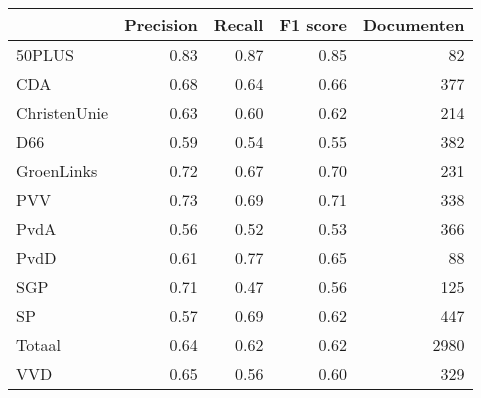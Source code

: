 \begin{tabular}{lrrrr}
\toprule
{} &  Precision &  Recall &  F1 score &  Documenten \\
\midrule
50PLUS       &       0.83 &    0.87 &      0.85 &          82 \\
CDA          &       0.68 &    0.64 &      0.66 &         377 \\
ChristenUnie &       0.63 &    0.60 &      0.62 &         214 \\
D66          &       0.59 &    0.54 &      0.55 &         382 \\
GroenLinks   &       0.72 &    0.67 &      0.70 &         231 \\
PVV          &       0.73 &    0.69 &      0.71 &         338 \\
PvdA         &       0.56 &    0.52 &      0.53 &         366 \\
PvdD         &       0.61 &    0.77 &      0.65 &          88 \\
SGP          &       0.71 &    0.47 &      0.56 &         125 \\
SP           &       0.57 &    0.69 &      0.62 &         447 \\
Totaal       &       0.64 &    0.62 &      0.62 &        2980 \\
VVD          &       0.65 &    0.56 &      0.60 &         329 \\
\bottomrule
\end{tabular}
